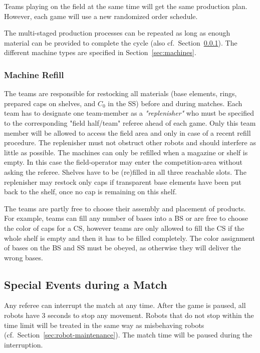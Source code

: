 \documentclass[12pt,twoside]{article}
\newcommand{\refsec}[1]{Section~\ref{#1}}
\begin{document}
Teams playing on the field at the same time will get the same
production plan. However, each game will use a new randomized order
schedule.

The multi-staged production processes can be repeated as long as
enough material can be provided to complete the cycle (also
cf.~\refsec{sec:machine-refill}). The different machine types are
specified in Section~\ref{sec:machines}.

\subsubsection{Machine Refill}
\label{sec:machine-refill}
The teams are responsible for restocking all materials (base elements,
rings, prepared caps on shelves, and $C_0$ in the SS) before and during matches. Each
team has to designate one team-member as a \textit{"replenisher"} who
must be specified to the corresponding "field half/team" referee ahead
of each game.  Only this team member will be allowed to access the
field area and only in case of a recent refill procedure.  The
replenisher must not obstruct other robots and should interfere as
little as possible.  The machines can only be refilled when a magazine
or shelf is empty. In this case the field-operator may enter the
competition-area without asking the referee. Shelves have to be
(re)filled in all three reachable slots. The replenisher may restock
only caps if transparent base elements have been put back to the
shelf, once no cap is remaining on this shelf.

The teams are partly free to choose their assembly and placement of
products.
For example, teams can fill any number of bases into a BS or are free to choose the color of caps for a CS,
however teams are only allowed to fill the CS if the whole shelf is empty and then it has to be filled completely.
The color assignment of bases on
the BS and SS must be obeyed, as otherwise they will deliver the wrong
bases.

\subsection{Special Events during a Match}
\label{sec:during-match}
Any referee can interrupt the match at any time. After the game is
paused, all robots have 3 seconds to stop any movement.  Robots that
do not stop within the time limit will be treated in the same way as
misbehaving robots (cf.~\refsec{sec:robot-maintenance}).  The match
time will be paused during the interruption.
\end{document}
